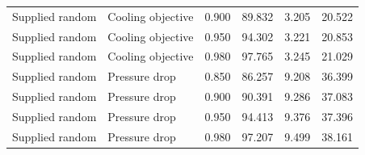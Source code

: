 \begin{longtable}{llllll}
Supplied random & Cooling objective & 0.900 & 89.832 & 3.205 & 20.522\\
Supplied random & Cooling objective & 0.950 & 94.302 & 3.221 & 20.853\\
Supplied random & Cooling objective & 0.980 & 97.765 & 3.245 & 21.029\\
Supplied random & Pressure drop & 0.850 & 86.257 & 9.208 & 36.399\\
Supplied random & Pressure drop & 0.900 & 90.391 & 9.286 & 37.083\\
Supplied random & Pressure drop & 0.950 & 94.413 & 9.376 & 37.396\\
Supplied random & Pressure drop & 0.980 & 97.207 & 9.499 & 38.161\\
\bottomrule\end{longtable}\endgroup
